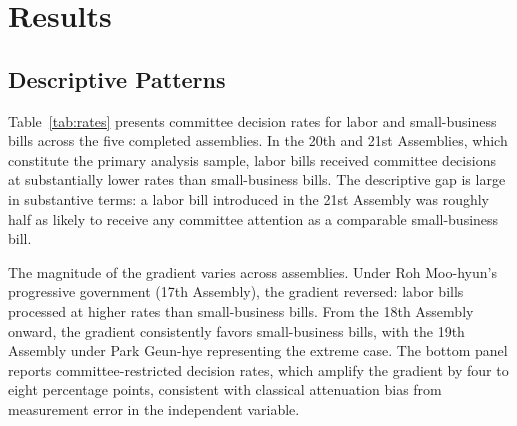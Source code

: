 \documentclass[11pt]{article}
\begin{document}

\section{Results}
\label{sec:results}

\subsection{Descriptive Patterns}

Table~\ref{tab:rates} presents committee decision rates for labor and small-business bills across the five completed assemblies. In the 20th and 21st Assemblies, which constitute the primary analysis sample, labor bills received committee decisions at substantially lower rates than small-business bills. The descriptive gap is large in substantive terms: a labor bill introduced in the 21st Assembly was roughly half as likely to receive any committee attention as a comparable small-business bill.

The magnitude of the gradient varies across assemblies. Under Roh Moo-hyun's progressive government (17th Assembly), the gradient reversed: labor bills processed at higher rates than small-business bills. From the 18th Assembly onward, the gradient consistently favors small-business bills, with the 19th Assembly under Park Geun-hye representing the extreme case. The bottom panel reports committee-restricted decision rates, which amplify the gradient by four to eight percentage points, consistent with classical attenuation bias from measurement error in the independent variable.
\end{document}
